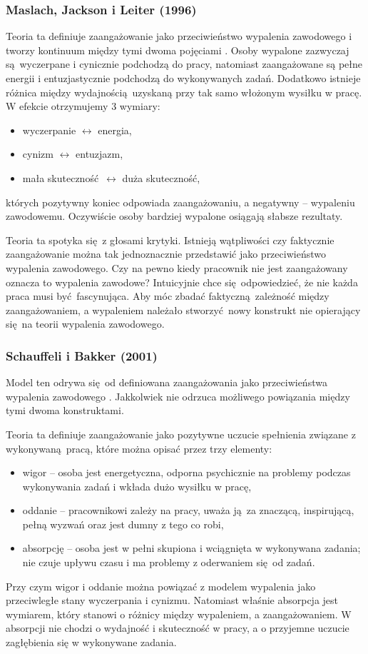 \subsubsection{Maslach, Jackson i Leiter (1996)}
\label{sec:model-maslach}
Teoria ta definiuje zaangażowanie jako przeciwieństwo wypalenia zawodowego i tworzy kontinuum między tymi dwoma pojęciami \citep{maslach1997truth}. Osoby wypalone zazwyczaj są wyczerpane i cynicznie podchodzą do pracy, natomiast zaangażowane są pełne energii i entuzjastycznie podchodzą do wykonywanych zadań. Dodatkowo istnieje różnica między wydajnością uzyskaną przy tak samo włożonym wysiłku w pracę. W efekcie otrzymujemy 3 wymiary:
\begin{itemize}
\item wyczerpanie $\leftrightarrow$ energia,
\item cynizm $\leftrightarrow$ entuzjazm,
\item mała skuteczność $\leftrightarrow$ duża skuteczność,
\end{itemize}
których pozytywny koniec odpowiada zaangażowaniu, a negatywny -- wypaleniu zawodowemu. Oczywiście osoby bardziej wypalone osiągają słabsze rezultaty.

Teoria ta spotyka się z głosami krytyki. Istnieją wątpliwości czy faktycznie zaangażowanie można tak jednoznacznie przedstawić jako przeciwieństwo wypalenia zawodowego. Czy na pewno kiedy pracownik nie jest zaangażowany oznacza to wypalenia zawodowe? Intuicyjnie chce się odpowiedzieć, że nie każda praca musi być fascynująca. Aby móc zbadać faktyczną zależność między zaangażowaniem, a wypaleniem należało stworzyć nowy konstrukt nie opierający się na teorii wypalenia zawodowego.

\subsubsection{Schauffeli i Bakker (2001)}
\label{sec:model-schauffeli}
Model ten odrywa się od definiowana zaangażowania jako przeciwieństwa wypalenia zawodowego \citep{schaufeli2002measurement}. Jakkolwiek nie odrzuca możliwego powiązania między tymi dwoma konstruktami. 

Teoria ta definiuje zaangażowanie jako pozytywne uczucie spełnienia związane z wykonywaną pracą, które można opisać przez trzy elementy:
\begin{itemize}
\item wigor -- osoba jest energetyczna, odporna psychicznie na problemy podczas wykonywania zadań i wkłada dużo wysiłku w pracę,
\item oddanie -- pracownikowi zależy na pracy, uważa ją za znaczącą, inspirującą, pełną wyzwań oraz jest dumny z tego co robi,
\item absorpcję -- osoba jest w pełni skupiona i wciągnięta w wykonywana zadania; nie czuje upływu czasu i ma problemy z oderwaniem się od zadań.
\end{itemize}
Przy czym wigor i oddanie można powiązać z modelem wypalenia jako przeciwległe stany wyczerpania i cynizmu. Natomiast właśnie absorpcja jest wymiarem, który stanowi o różnicy między wypaleniem, a zaangażowaniem. W absorpcji nie chodzi o wydajność i skuteczność w pracy, a o przyjemne uczucie zagłębienia się w wykonywane zadania.

